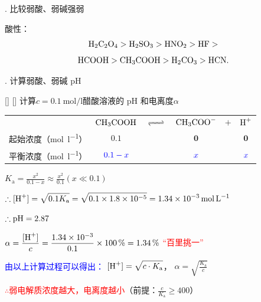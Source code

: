         . 比较弱酸、弱碱强弱

            酸性：
            \[\cemh{H2C2O4} > \cemh{H2SO3} > \cemh{HNO2} > \cemh{HF} > \]
            \[\cemh{HCOOH} > \cemh{CH3COOH} > \cemh{H2CO3} > \cemh{HCN}.\]
            
        . 计算弱酸、弱碱 pH
        
            \begin{xmp}
                [电离常数计算弱酸、弱碱 pH 例]
                {}
                []
                []
                计算\(c=\SI{0.1}{\mole\per\litre}\)醋酸溶液的 pH 和电离度\(\alpha\)
                \begin{center}
                    \begin{tabular}{r@{\quad}c@{\quad}c@{\quad}c@{\quad}c@{\quad}c}
                        & \(\mathbf{\cemh{CH3COOH}} \) & \(\mathbf{\cemh{<=>}} \) & \(\mathbf{\cemh{CH3COO-}} \) & \(\mathbf{+} \) & \(\mathbf{\cemh{H+}} \) \\
                        起始浓度（\si{\mole\per\litre}） & \(\mathbf{0.1}\) && \(\mathbf{0}\) && \(\mathbf{0}\) \\ 
                        平衡浓度（\si{\mole\per\litre}） & \(\mathcolor{blue}{0.1-x}\) && \(\mathcolor{blue}{x}\) && \(\mathcolor{blue}{x}\) \\
                    \end{tabular}
                \end{center}
                \( \displaystyle K_\text{a} = \frac{x^2}{0.1-x}\approx\frac{x^2}{0.1}(x\ll 0.1)\)

                \( \displaystyle \therefore\cemh{[H+]}=\sqrt{0.1K_\text{a}}=\sqrt{0.1\times 1.8\times 10^{-5}}=\SI{1.34E-3}{\mole\per\litre} \)

                \( \therefore\cemh{pH} = 2.87 \) 

                \( \displaystyle \alpha = \frac{\cemh{[H+]}}{c} = \frac{\num{1.34E-3}}{0.1}\times \SI{100}{\percent} = \SI{1.34}{\percent} \)
                \quad \textcolor{red}{“百里挑一”}
            \end{xmp}

            \textcolor{blue}{由以上计算过程可以得出：}
            \( \displaystyle \cemh{[H+]} = \sqrt{c\cdot K_\text{a}}\)，
            \( \displaystyle \alpha = \sqrt{\frac{K_\text{a}}{c}}\)

            \textcolor{red}{\(\therefore\)弱电解质浓度越大，电离度越小}\hfil（前提：\( \displaystyle \frac{c}{K_\text{a}} \ge 400 \)）

